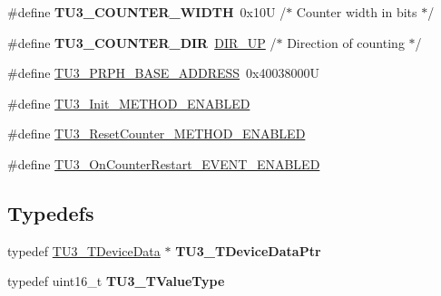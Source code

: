 \begin{DoxyCompactItemize}
\item 
\hypertarget{group___t_u3__module_ga326b4dc4ffc02735174c4cb15e0079be}{\#define {\bfseries T\-U3\-\_\-\-C\-O\-U\-N\-T\-E\-R\-\_\-\-W\-I\-D\-T\-H}~0x10\-U       /$\ast$ Counter width in bits  $\ast$/}\label{group___t_u3__module_ga326b4dc4ffc02735174c4cb15e0079be}

\item 
\hypertarget{group___t_u3__module_ga196fd455d19f6cfe0ddf089ddaf04091}{\#define {\bfseries T\-U3\-\_\-\-C\-O\-U\-N\-T\-E\-R\-\_\-\-D\-I\-R}~\hyperlink{group___p_e___types__module_gga89181fe4df1c4701239176768b4a9ce5a0b76fb863426c07c6c997a8d9523257b}{D\-I\-R\-\_\-\-U\-P}      /$\ast$ Direction of counting $\ast$/}\label{group___t_u3__module_ga196fd455d19f6cfe0ddf089ddaf04091}

\item 
\#define \hyperlink{group___t_u3__module_gafc0845a05be4a2b3c75767506daaaad7}{T\-U3\-\_\-\-P\-R\-P\-H\-\_\-\-B\-A\-S\-E\-\_\-\-A\-D\-D\-R\-E\-S\-S}~0x40038000\-U
\item 
\#define \hyperlink{group___t_u3__module_gab8e5ad58eeb2e81ca987df48b5950055}{T\-U3\-\_\-\-Init\-\_\-\-M\-E\-T\-H\-O\-D\-\_\-\-E\-N\-A\-B\-L\-E\-D}
\item 
\#define \hyperlink{group___t_u3__module_ga5f42d3c8407e5c1278533d90d588cf92}{T\-U3\-\_\-\-Reset\-Counter\-\_\-\-M\-E\-T\-H\-O\-D\-\_\-\-E\-N\-A\-B\-L\-E\-D}
\item 
\#define \hyperlink{group___t_u3__module_ga545875f4bd460d1d6c472150a4648654}{T\-U3\-\_\-\-On\-Counter\-Restart\-\_\-\-E\-V\-E\-N\-T\-\_\-\-E\-N\-A\-B\-L\-E\-D}
\end{DoxyCompactItemize}
\subsection*{Typedefs}
\begin{DoxyCompactItemize}
\item 
\hypertarget{group___t_u3__module_ga8889e14cead5539a109b3df37aa9140a}{typedef \hyperlink{struct_t_u3___t_device_data}{T\-U3\-\_\-\-T\-Device\-Data} $\ast$ {\bfseries T\-U3\-\_\-\-T\-Device\-Data\-Ptr}}\label{group___t_u3__module_ga8889e14cead5539a109b3df37aa9140a}

\item 
\hypertarget{group___t_u3__module_gaebd848f086834d180830cf9a1f7eea87}{typedef uint16\-\_\-t {\bfseries T\-U3\-\_\-\-T\-Value\-Type}}\label{group___t_u3__module_gaebd848f086834d180830cf9a1f7eea87}

\end{DoxyCompactItemize}
